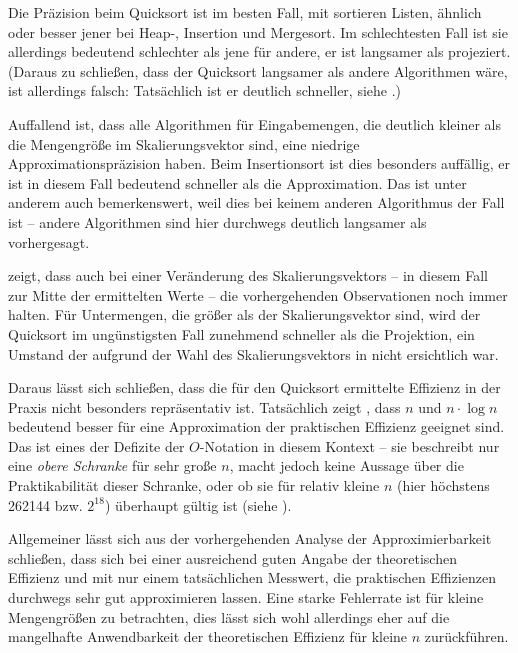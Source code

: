Die Präzision beim Quicksort ist im besten Fall, mit sortieren Listen, ähnlich oder besser jener bei Heap-, Insertion und Mergesort. Im schlechtesten Fall ist sie allerdings bedeutend schlechter als jene für andere, er ist langsamer als projeziert. (Daraus zu schließen, dass der Quicksort langsamer als andere Algorithmen wäre, ist allerdings falsch: Tatsächlich ist er deutlich schneller, siehe .)

Auffallend ist, dass alle Algorithmen für Eingabemengen, die deutlich kleiner als die Mengengröße im Skalierungsvektor sind, eine niedrige Approximationspräzision haben. Beim Insertionsort ist dies besonders auffällig, er ist in diesem Fall bedeutend schneller als die Approximation. Das ist unter anderem auch bemerkenswert, weil dies bei keinem anderen Algorithmus der Fall ist -- andere Algorithmen sind hier durchwegs deutlich langsamer als vorhergesagt.



 zeigt, dass auch bei einer Veränderung des Skalierungsvektors -- in diesem Fall zur Mitte der ermittelten Werte -- die vorhergehenden Observationen noch immer halten. Für Untermengen, die größer als der Skalierungsvektor sind, wird der Quicksort im ungünstigsten Fall zunehmend schneller als die Projektion, ein Umstand der aufgrund der Wahl des Skalierungsvektors in  nicht ersichtlich war.

Daraus lässt sich schließen, dass die für den Quicksort ermittelte Effizienz in der Praxis nicht besonders repräsentativ ist. Tatsächlich zeigt , dass $n$ und $n \cdot \log{n}$ bedeutend besser für eine Approximation der praktischen Effizienz geeignet sind. Das ist eines der Defizite der $O$-Notation in diesem Kontext -- sie beschreibt nur eine \emph{obere Schranke} für sehr große $n$, macht jedoch keine Aussage über die Praktikabilität dieser Schranke, oder ob sie für relativ kleine $n$ (hier höchstens 262144 bzw. $2^{18}$) überhaupt gültig ist (siehe ).



Allgemeiner lässt sich aus der vorhergehenden Analyse der Approximierbarkeit schließen, dass sich bei einer ausreichend guten Angabe der theoretischen Effizienz und mit nur einem tatsächlichen Messwert, die praktischen Effizienzen durchwegs sehr gut approximieren lassen. Eine starke Fehlerrate ist für kleine Mengengrößen zu betrachten, dies lässt sich wohl allerdings eher auf die mangelhafte Anwendbarkeit der theoretischen Effizienz für kleine $n$ zurückführen.

